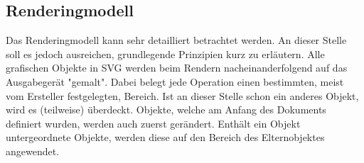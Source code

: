  
\subsection{Renderingmodell}
Das Renderingmodell kann sehr detailliert betrachtet werden. An dieser Stelle soll es jedoch ausreichen, grundlegende Prinzipien kurz zu erläutern.
Alle grafischen Objekte in SVG werden beim Rendern nacheinanderfolgend auf das Ausgabegerät "gemalt". Dabei belegt jede Operation einen bestimmten, meist vom Ersteller festgelegten, Bereich. Ist an dieser Stelle schon ein anderes Objekt, wird es (teilweise) überdeckt.
Objekte, welche am Anfang des Dokuments definiert wurden, werden auch zuerst gerändert. Enthält ein Objekt untergeordnete Objekte, werden diese auf den Bereich des Elternobjektes angewendet.
